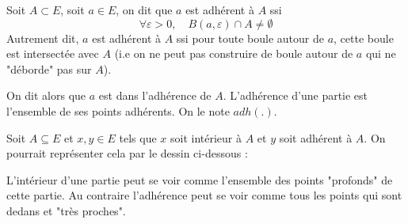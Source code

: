 \begin{definition}[Adhérence]
    Soit $A \subset E$, soit $a \in E$, on dit que $a$ est adhérent à $A$ ssi 
        \[ \boxed { \forall \varepsilon > 0, \quad B(a,\varepsilon) \cap A \not = \emptyset } \] 
    Autrement dit, $a$ est adhérent à $A$ ssi pour toute boule autour de $a$, cette boule est intersectée avec $A$
    (i.e on ne peut pas construire de boule autour de $a$ qui ne "déborde" pas sur $A$).

    On dit alors que $a$ est dans l'adhérence de $A$. L'adhérence d'une partie est l'ensemble de ses points adhérents. 
    On le note $adh(.)$.
\end{definition}

\begin{remark}[Illustration]
    Soit $A \subseteq E$ et $x,y \in E$ tels que $x$ soit intérieur à $A$ et $y$ soit adhérent à $A$. 
    On pourrait représenter cela par le dessin ci-dessous :

    \begin{center}
    \end{center}

    L'intérieur d'une partie peut se voir comme l'ensemble des points "profonds" de cette partie. 
    Au contraire l'adhérence peut se voir comme tous les points qui sont dedans et "très proches". 
\end{remark}

